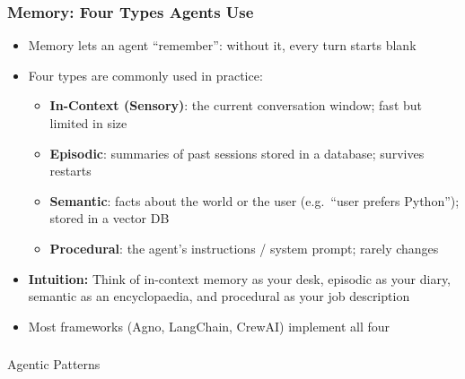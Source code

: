 \begin{frame}[fragile]\frametitle{Memory: Four Types Agents Use}
      \begin{itemize}
        \item Memory lets an agent ``remember'': without it, every turn starts blank
        \item Four types are commonly used in practice:
        \begin{itemize}
            \item \textbf{In-Context (Sensory)}: the current conversation window; fast but limited in size
            \item \textbf{Episodic}: summaries of past sessions stored in a database; survives restarts
            \item \textbf{Semantic}: facts about the world or the user (e.g.\ ``user prefers Python''); stored in a vector DB
            \item \textbf{Procedural}: the agent's instructions / system prompt; rarely changes
        \end{itemize}
        \item \textbf{Intuition:} Think of in-context memory as your desk, episodic as your diary, semantic as an encyclopaedia, and procedural as your job description
        \item Most frameworks (Agno, LangChain, CrewAI) implement all four
      \end{itemize}
\end{frame}



\begin{frame}[fragile]\frametitle{}
\begin{center}
{\Large Agentic Patterns}
\end{center}
\end{frame}

